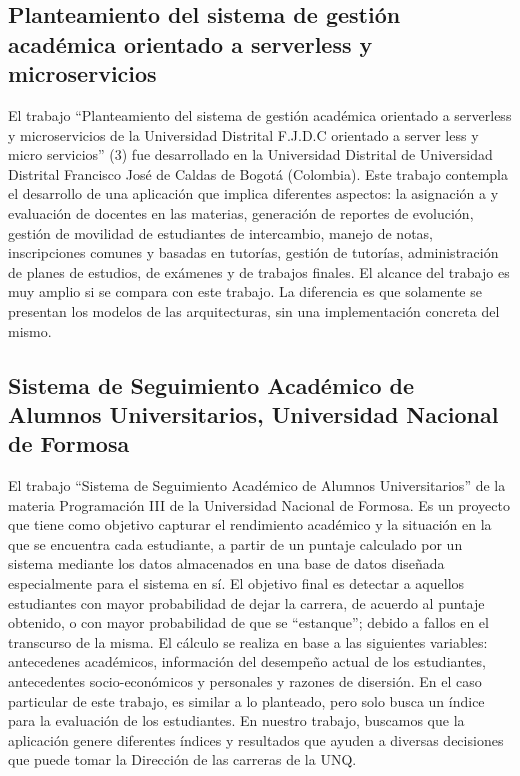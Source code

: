 \subsection[Planteamiento del sistema de gestión académica orientado a serverless y microservicios]{Planteamiento del sistema de gestión académica orientado a serverless y microservicios}

El trabajo “Planteamiento del sistema de gestión académica orientado a serverless y microservicios de la Universidad Distrital F.J.D.C
orientado a server less y micro servicios” (3) fue desarrollado en la Universidad Distrital de Universidad Distrital Francisco José de Caldas de Bogotá (Colombia). Este trabajo contempla el desarrollo de una aplicación que implica diferentes aspectos: la asignación a y evaluación de docentes en las materias, generación de reportes de evolución, gestión de movilidad de estudiantes de intercambio, manejo de notas, inscripciones comunes y basadas en tutorías, gestión de tutorías, administración de planes de estudios, de exámenes y de trabajos finales. El alcance del trabajo es muy amplio si se compara con este trabajo. La diferencia es que solamente se presentan los modelos de las arquitecturas, sin una implementación concreta del mismo.


\subsection[Sistema de Seguimiento Académico de Alumnos Universitarios, Universidad Nacional de Formosa]{Sistema de Seguimiento Académico de Alumnos Universitarios, Universidad Nacional de Formosa}
El trabajo “Sistema de Seguimiento Académico de Alumnos Universitarios”  de la materia Programación III de la Universidad Nacional de Formosa. Es un proyecto que tiene como objetivo capturar el rendimiento académico y la situación en la que se encuentra cada estudiante, a partir de un puntaje calculado por un sistema mediante los datos almacenados en una base
de datos diseñada especialmente para el sistema en sí. El objetivo final es detectar a aquellos estudiantes con mayor probabilidad de dejar la carrera, de acuerdo al puntaje obtenido, o con mayor probabilidad de que se “estanque”; debido a fallos en el transcurso de la misma. El cálculo se realiza en base a las siguientes variables: antecedenes académicos, información del desempeño actual de los estudiantes, antecedentes socio-económicos y personales y razones de disersión. En el caso particular de este trabajo, es similar a lo planteado, pero solo busca un índice para la evaluación de los estudiantes. En nuestro trabajo, buscamos que la aplicación genere diferentes índices y resultados que ayuden a diversas decisiones que puede tomar la
Dirección de las carreras de la UNQ.

